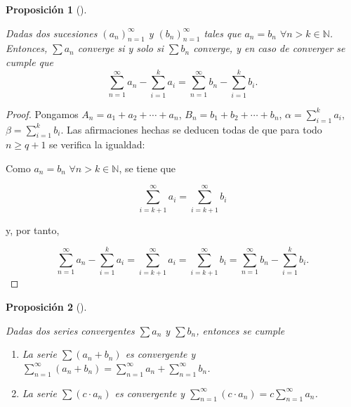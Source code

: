 \documentclass[
  a4paper,
]{scrreport}
\providecommand{\tightlist}{%
  \setlength{\itemsep}{0pt}\setlength{\parskip}{0pt}}\usepackage{longtable,booktabs,array}
\theoremstyle{definition}
\theoremstyle{plain}
\theoremstyle{definition}
\theoremstyle{definition}
\theoremstyle{plain}
\theoremstyle{plain}
\newtheorem{proposition}{Proposición}[chapter]
\theoremstyle{remark}
\begin{document}
\begin{proposition}[]\protect\hypertarget{prp-series-iguales-excepto-n-terminos}{}\label{prp-series-iguales-excepto-n-terminos}

Dadas dos sucesiones \((a_n)_{n=1}^\infty\) y \((b_n)_{n=1}^\infty\)
tales que \(a_n=b_n\) \(\forall n>k\in\mathbb{N}\). Entonces,
\(\sum a_n\) converge si y solo si \(\sum b_n\) converge, y en caso de
converger se cumple que \[
\sum_{n=1}^\infty a_n-\sum_{i=1}^{k}a_i=\sum_{n=1}^\infty b_n-\sum_{i=1}^{k}b_i.
\]

\end{proposition}

\begin{tcolorbox}[enhanced jigsaw, leftrule=.75mm, colbacktitle=quarto-callout-note-color!10!white, toprule=.15mm, opacityback=0, opacitybacktitle=0.6, toptitle=1mm, breakable, bottomtitle=1mm, colframe=quarto-callout-note-color-frame, rightrule=.15mm, titlerule=0mm, title=\textcolor{quarto-callout-note-color}{\faInfo}\hspace{0.5em}{Demostración}, arc=.35mm, left=2mm, bottomrule=.15mm, colback=white, coltitle=black]

\begin{proof}
Pongamos \(A_n=a_1+a_2+\cdots+a_n\), \(B_n=b_1+b_2+\cdots+b_n\),
\(\alpha=\sum_{i=1}^{k}a_i\), \(\beta=\sum_{i=1}^{k}b_i\). Las
afirmaciones hechas se deducen todas de que para todo \(n\ge q+1\) se
verifica la igualdad:

Como \(a_n=b_n\) \(\forall n>k\in\mathbb{N}\), se tiene que

\[
\sum_{i=k+1}^\infty a_i=\sum_{i=k+1}^\infty b_i
\]

y, por tanto,

\[
\sum_{n=1}^\infty a_n-\sum_{i=1}^k a_i= \sum_{i=k+1}^\infty a_i=\sum_{i=k+1}^\infty b_i =  \sum_{n=1}^\infty b_n-\sum_{i=1}^{k}b_i.
\]
\end{proof}

\end{tcolorbox}

\begin{proposition}[]\protect\hypertarget{prp-linealidad-series-convergentes}{}\label{prp-linealidad-series-convergentes}

Dadas dos series convergentes \(\sum a_n\) y \(\sum b_n\), entonces se
cumple

\begin{enumerate}
\def\labelenumi{\alph{enumi}.}
\tightlist
\item
  La serie \(\sum (a_n+b_n)\) es convergente y
  \(\sum_{n=1}^\infty (a_n+b_n) = \sum_{n=1}^\infty a_n +\sum_{n=1}^\infty b_n\).
\item
  La serie \(\sum (c\cdot a_n)\) es convergente y
  \(\sum_{n=1}^\infty (c\cdot a_n) = c\sum_{n=1}^\infty a_n\).
\end{enumerate}

\end{proposition}
\end{document}
